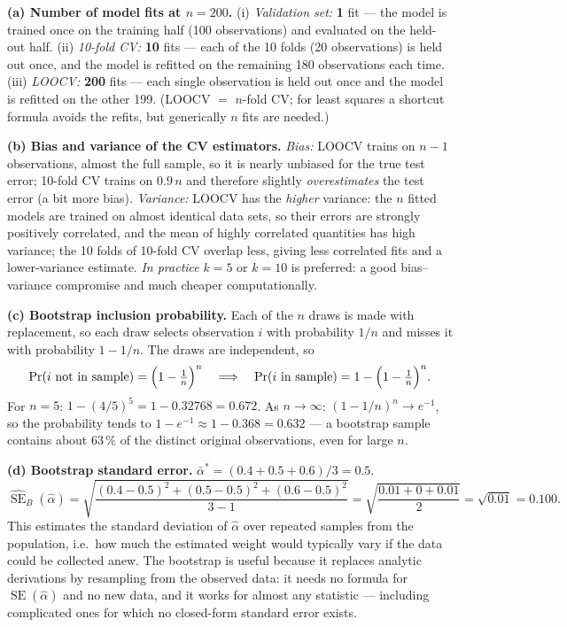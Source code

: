 \documentclass[11pt,a4paper]{article}
\begin{document}
\ifdefined\withsolutions
\begin{solutionbox}
\textbf{(a) Number of model fits at $n=200$.}
(i) \emph{Validation set:} \textbf{1} fit --- the model is trained once on the training
half (100 observations) and evaluated on the held-out half.
(ii) \emph{10-fold CV:} \textbf{10} fits --- each of the 10 folds (20 observations) is
held out once, and the model is refitted on the remaining 180 observations each time.
(iii) \emph{LOOCV:} \textbf{200} fits --- each single observation is held out once and
the model is refitted on the other 199. (LOOCV $=$ $n$-fold CV; for least squares a
shortcut formula avoids the refits, but generically $n$ fits are needed.)

\medskip
\textbf{(b) Bias and variance of the CV estimators.}
\emph{Bias:} LOOCV trains on $n-1$ observations, almost the full sample, so it is nearly
unbiased for the true test error; 10-fold CV trains on $0.9\,n$ and therefore slightly
\emph{overestimates} the test error (a bit more bias). \emph{Variance:} LOOCV has the
\emph{higher} variance: the $n$ fitted models are trained on almost identical data sets,
so their errors are strongly positively correlated, and the mean of highly correlated
quantities has high variance; the 10 folds of 10-fold CV overlap less, giving less
correlated fits and a lower-variance estimate. \emph{In practice} $k=5$ or $k=10$ is
preferred: a good bias--variance compromise and much cheaper computationally.

\medskip
\textbf{(c) Bootstrap inclusion probability.}
Each of the $n$ draws is made with replacement, so each draw selects observation $i$ with
probability $1/n$ and misses it with probability $1-1/n$. The draws are independent, so
\[
\Pr(i\ \text{not in sample})=\Bigl(1-\tfrac{1}{n}\Bigr)^{n}
\quad\Longrightarrow\quad
\Pr(i\ \text{in sample})=1-\Bigl(1-\tfrac{1}{n}\Bigr)^{n}.
\]
For $n=5$: $1-(4/5)^5=1-0.32768=0.672$.
As $n\to\infty$: $(1-1/n)^n\to e^{-1}$, so the probability tends to
$1-e^{-1}\approx 1-0.368=0.632$ --- a bootstrap sample contains about $63\,\%$ of the
distinct original observations, even for large $n$.

\medskip
\textbf{(d) Bootstrap standard error.}
$\bar{\alpha}^{*}=(0.4+0.5+0.6)/3=0.5$.
\[
\widehat{\operatorname{SE}}_B(\hat{\alpha})
=\sqrt{\frac{(0.4-0.5)^2+(0.5-0.5)^2+(0.6-0.5)^2}{3-1}}
=\sqrt{\frac{0.01+0+0.01}{2}}
=\sqrt{0.01}=0.100 .
\]
This estimates the standard deviation of $\hat{\alpha}$ over repeated samples from the
population, i.e.\ how much the estimated weight would typically vary if the data could be
collected anew. The bootstrap is useful because it replaces analytic derivations by
resampling from the observed data: it needs no formula for
$\operatorname{SE}(\hat{\alpha})$ and no new data, and it works for almost any statistic
--- including complicated ones for which no closed-form standard error exists.
\end{solutionbox}
\fi
\end{document}
